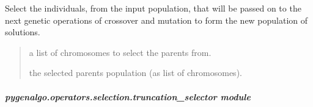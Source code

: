 \documentclass[letterpaper,10pt,english]{sphinxmanual}
\begin{document}
\begin{fulllineitems}
\begin{fulllineitems}
\label{\detokenize{pygenalgo.operators.selection:pygenalgo.operators.selection.tournament_selector.TournamentSelector.select}}
\pysigstartsignatures
{}
\pysigstopsignatures
\sphinxAtStartPar
Select the individuals, from the input population, that will be passed on to the next
genetic operations of crossover and mutation to form the new population of solutions.
\begin{quote}\begin{description}
\sphinxAtStartPar
{} \textendash{} a list of chromosomes to select the parents from.

\sphinxAtStartPar
the selected parents population (as list of chromosomes).

\end{description}\end{quote}

\end{fulllineitems}


\end{fulllineitems}



\subparagraph{pygenalgo.operators.selection.truncation\_selector module}
\label{\detokenize{pygenalgo.operators.selection:module-pygenalgo.operators.selection.truncation_selector}}\label{\detokenize{pygenalgo.operators.selection:pygenalgo-operators-selection-truncation-selector-module}}
\end{document}
